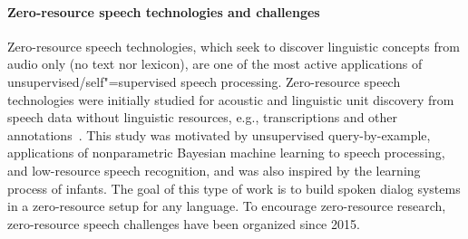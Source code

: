 \paragraph{Zero-resource speech technologies and challenges}
\label{zero_speech}
Zero-resource speech technologies, which seek to discover linguistic concepts
from audio only (no text nor lexicon), are one of the most active applications
of unsupervised/self"=supervised speech processing.
Zero-resource speech technologies were initially studied for acoustic and
linguistic unit discovery from speech data without linguistic resources,
e.g., transcriptions and other annotations~\parencite{jansen_summary_2013}.
This study was motivated by unsupervised query-by-example, applications of
nonparametric Bayesian machine learning to speech processing, and low-resource
speech recognition, and was also inspired by the learning process of infants.
The goal of this type of work is to build spoken dialog systems in a zero-resource
setup for any language.
  To encourage      zero-resource research,                  %
zero-resource speech challenges have been organized since 2015.

